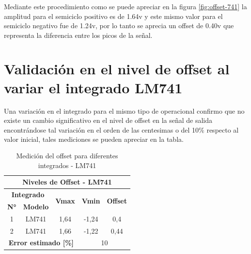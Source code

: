 \documentclass[conference]{IEEEtran}
\begin{document}
	Mediante este procedimiento como se puede apreciar en la figura \ref{fig:offset-741} la amplitud para el semiciclo positivo es de 1.64v y este mismo valor para el semiciclo negativo fue de 1.24v, por lo tanto se aprecia un offset de 0.40v que representa la diferencia entre los picos de la señal.
	
	\section{Validación en el nivel de offset al variar el integrado LM741}
	
	Una variación en el integrado para el mismo tipo de operacional confirmo que no existe un cambio significativo en el nivel de offset en la señal de salida encontrándose tal variación en el orden de las centesimas o del 10\% respecto al valor inicial, tales mediciones se pueden apreciar en la tabla.
	
	\begin{table}[]
		\centering
		\begin{tabular}{|ccccc|}
			\hline
			\multicolumn{5}{|c|}{\textbf{Niveles de Offset - LM741}}                                                                                                                                                                \\ \hline
			\multicolumn{2}{|c|}{\textbf{Integrado}}                                 & \multicolumn{1}{c|}{\multirow{2}{*}{\textbf{Vmax}}} & \multicolumn{1}{c|}{\multirow{2}{*}{\textbf{Vmin}}} & \multirow{2}{*}{\textbf{Offset}} \\ \cline{1-2}
			\multicolumn{1}{|c|}{\textbf{N°}} & \multicolumn{1}{c|}{\textbf{Modelo}} & \multicolumn{1}{c|}{}                               & \multicolumn{1}{c|}{}                               &                                  \\ \hline
			\multicolumn{1}{|c|}{1}           & \multicolumn{1}{c|}{LM741}           & \multicolumn{1}{c|}{1,64}                           & \multicolumn{1}{c|}{-1,24}                          & 0,4                              \\ \hline
			\multicolumn{1}{|c|}{2}           & \multicolumn{1}{c|}{LM741}           & \multicolumn{1}{c|}{1,66}                           & \multicolumn{1}{c|}{-1,22}                          & 0,44                             \\ \hline
			\multicolumn{3}{|c|}{\textbf{Error estimado {[}\%{]}}}                                                                         & \multicolumn{2}{c|}{10}                                                                \\ \hline
		\end{tabular}
		\caption{Medición del offset para diferentes integrados - LM741}
		\label{tab:comparacion-offset-lm741}
	\end{table}
	
\end{document}
